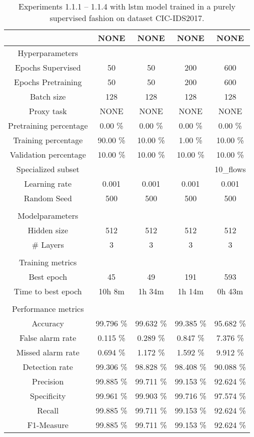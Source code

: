 \begin{table}[htb]
    \centering
    \caption{Experiments 1.1.1 – 1.1.4 with \gls{lstm} model trained in a purely supervised fashion on dataset CIC-IDS2017.}
    \label{table:results:lstm:flows_supervised}
    \begin{tabular}{@{}ccccc@{}}
        \toprule
         &  NONE &  NONE &  NONE &  NONE \\
        \midrule
        Hyperparameters &  &  &  &  \\
        Epochs Supervised &  50 &  50 &  200 &  600 \\
        Epochs Pretraining &  50 &  50 &  200 &  600 \\
        Batch size &  128 &  128 &  128 &  128 \\
        Proxy task &  NONE &  NONE &  NONE &  NONE \\
        Pretraining percentage &  0.00 \% &  0.00 \% &  0.00 \% &  0.00 \% \\
        Training percentage &  90.00 \% &  10.00 \% &  1.00 \% &  10.00 \% \\
        Validation percentage &  10.00 \% &  10.00 \% &  10.00 \% &  10.00 \% \\
        Specialized subset &   &   &   &  10\_flows \\
        Learning rate &  0.001 &  0.001 &  0.001 &  0.001 \\
        Random Seed &  500 &  500 &  500 &  500 \\
         \\
        Modelparameters &  &  &  &  \\
        Hidden size &  512 &  512 &  512 &  512 \\
        \# Layers &  3 &  3 &  3 &  3 \\
         \\
        Training metrics &  &  &  &  \\
        Best epoch &  45 &  49 &  191 &  593 \\
        Time to best epoch &  10h 8m &  1h 34m &  1h 14m &  0h 43m \\
         \\
        Performance metrics &  &  &  &  \\
        Accuracy &  99.796 \% &  99.632 \% &  99.385 \% &  95.682 \% \\
        False alarm rate &  0.115 \% &  0.289 \% &  0.847 \% &  7.376 \% \\
        Missed alarm rate &  0.694 \% &  1.172 \% &  1.592 \% &  9.912 \% \\
        Detection rate &  99.306 \% &  98.828 \% &  98.408 \% &  90.088 \% \\
        Precision &  99.885 \% &  99.711 \% &  99.153 \% &  92.624 \% \\
        Specificity &  99.961 \% &  99.903 \% &  99.716 \% &  97.574 \% \\
        Recall &  99.885 \% &  99.711 \% &  99.153 \% &  92.624 \% \\
        F1-Measure &  99.885 \% &  99.711 \% &  99.153 \% &  92.624 \% \\
        \bottomrule
    \end{tabular}
\end{table}
